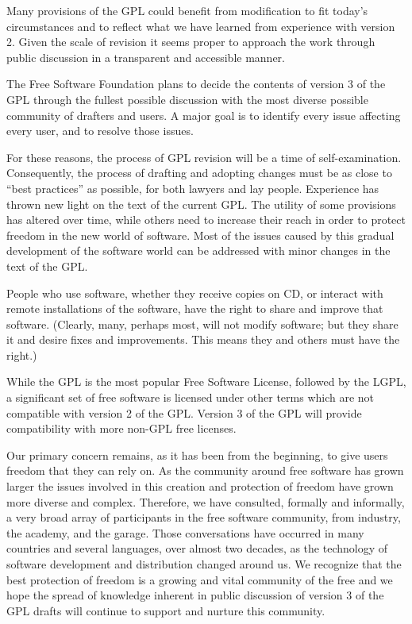 \documentclass[a4paper,spanish,12pt]{book}
\begin{document}
Many provisions of the GPL could benefit from modification to fit
today's circumstances and to reflect what we have learned from
experience with version 2.  Given the scale of revision it seems
proper to approach the work through public discussion in a transparent
and accessible manner.

\enlargethispage{20pt} The Free Software Foundation plans to decide
the contents of version 3 of the GPL through the fullest possible
discussion with the most diverse possible community of drafters and
users.  A major goal is to identify every issue affecting every user,
and to resolve those issues.

For these reasons, the process of GPL revision will be a time of
self-examination.  Consequently, the process of drafting and adopting
changes must be as close to ``best practices'' as possible, for both
lawyers and lay people.  Experience has thrown new light on the text
of the current GPL\@.  The utility of some provisions has altered over
time, while others need to increase their reach in order to protect
freedom in the new world of software.  Most of the issues caused by
this gradual development of the software world can be addressed with
minor changes in the text of the GPL\@.

People who use software, whether they receive copies on CD, or
interact with remote installations of the software, have the right to
share and improve that software.  (Clearly, many, perhaps most, will
not modify software; but they share it and desire fixes and
improvements.  This means they and others must have the right.)

While the GPL is the most popular Free Software License, followed by
the LGPL\@, a significant set of free software is licensed under other
terms which are not compatible with version 2 of the GPL\@.  Version 3
of the GPL will provide compatibility with more non-GPL free licenses.

Our primary concern remains, as it has been from the beginning, to
give users freedom that they can rely on.  As the community around
free software has grown larger the issues involved in this creation
and protection of freedom have grown more diverse and complex.
Therefore, we have consulted, formally and informally, a very broad
array of participants in the free software community, from industry,
the academy, and the garage.  Those conversations have occurred in
many countries and several languages, over almost two decades, as the
technology of software development and distribution changed around us.
We recognize that the best protection of freedom is a growing and
vital community of the free and we hope the spread of knowledge
inherent in public discussion of version 3 of the GPL drafts will
continue to support and nurture this community.
\end{document}
